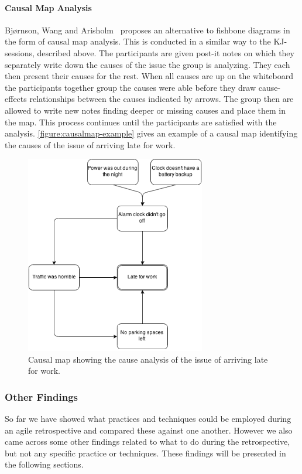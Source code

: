 \documentclass[12pt]{article}
\begin{document}
\paragraph{Causal Map Analysis}
Bjørnson, Wang and Arisholm~\cite{Wang2012} proposes an alternative to fishbone diagrams in the form of causal map analysis. This is conducted in a similar way to the KJ-sessions, described above. The participants are given post-it notes on which they separately write down the causes of the issue the group is analyzing. They each then present their causes for the rest. When all causes are up on the whiteboard the participants together group the causes were able before they draw cause-effects relationships between the causes indicated by arrows. The group then are allowed to write new notes finding deeper or missing causes and place them in the map. This process continues until the participants are satisfied with the analysis. \autoref{figure:causalmap-example} gives an example of a causal map identifying the causes of the issue of arriving late for work.

\begin{figure}[h!]
	\centering
	\includegraphics[width=0.7\textwidth]{figures/causalmap-example.png}
	\caption{Causal map showing the cause analysis of the issue of arriving late for work.}
	\label{figure:causalmap-example}
\end{figure}


\subsubsection{Other Findings} 
So far we have showed what practices and techniques could be employed during an agile retrospective and compared these against one another. However we also came across some other findings related to what to do during the retrospective, but not any specific practice or techniques. These findings will be presented in the following sections. 
\end{document}
